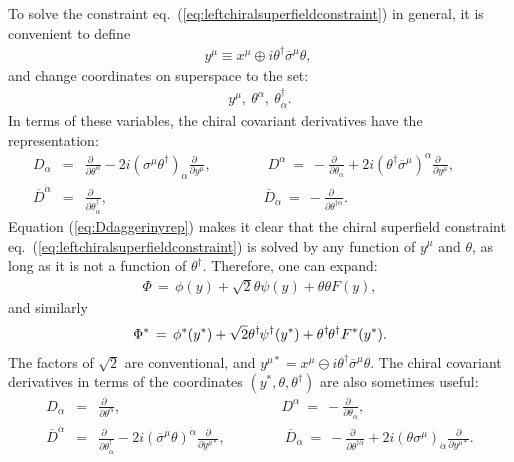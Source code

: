 \documentclass[11pt]{article}
\def\BDplus{+}
\def\BDminus{-}
\def\thetasigmamuthetadagger{\theta\sigma^\mu\theta^\dagger}
\def\BDplus{-}
\def\BDminus{+}
\def\thetasigmamuthetadagger{\theta^\dagger\sigmabar^\mu\theta}
\def\BDplus{\oplus}
\def\BDminus{\ominus}
\def\thetasigmamuthetadagger{\theta\sigma^\mu\theta^\dagger}
\def\BDplus{\ominus}
\def\BDminus{\oplus}
\def\thetasigmamuthetadagger{\theta^\dagger\sigmabar^\mu\theta}
\newcommand{\thdthd}{\theta^\dagger\hspace{-1pt}\theta^\dagger}
\def\beq{\begin{eqnarray}}
\def\eeq{\end{eqnarray}}
\def\sigmabar{\overline\sigma}
\def\Dcon{\overline D}
\begin{document}
To solve the constraint eq.~(\ref{eq:leftchiralsuperfieldconstraint}) in 
general, it is convenient to define
\beq
y^\mu \equiv x^\mu \BDminus i \thetasigmamuthetadagger ,\>
\label{eq:defineycoord}
\eeq
and change coordinates on superspace to the set:
\beq
y^\mu,\>\theta^\alpha,\>\theta^\dagger_{\dot\alpha}.
\eeq
In terms of these variables, the chiral covariant derivatives have the 
representation:
\beq
D_\alpha &=& \frac{\partial\phantom{x}}{\partial\theta^\alpha} 
-2i (\sigma^\mu \theta^\dagger)_\alpha 
\frac{\partial\phantom{x}}{\partial y^\mu} ,
\qquad\qquad
D^\alpha \>=\> -\frac{\partial\phantom{x}}{\partial\theta_\alpha} 
+2i (\theta^\dagger \sigmabar^\mu)^\alpha 
\frac{\partial\phantom{x}}{\partial y^\mu} ,
\phantom{xxxx}
\label{eq:Dinyrep}
\\
\Dcon^{\dot\alpha} &=& 
\frac{\partial\phantom{x}}{\partial\theta^\dagger_{\dot\alpha}} , 
\qquad\qquad\qquad\qquad\qquad\>\>\>\>\>
\Dcon_{\dot\alpha} \>=\> 
-\frac{\partial\phantom{x}}{\partial\theta^{\dagger\dot\alpha}} . 
\label{eq:Ddaggerinyrep}
\eeq
Equation (\ref{eq:Ddaggerinyrep}) makes it clear that the chiral 
superfield 
constraint eq.~(\ref{eq:leftchiralsuperfieldconstraint}) is solved by any 
function of $y^\mu$ and $\theta$, as long as it is not a function of $\theta^\dagger$. 
Therefore, one can expand:
\beq
\Phi \,=\,
\phi(y) + \sqrt{2}\theta \psi(y) + \theta\theta F(y) ,
\label{eq:Phiinyrep}
\eeq
and similarly
\beq
\Phi^* \,=\, 
\phi^*(y^*) + \sqrt{2}\theta^\dagger\hspace{-1pt} \psi^\dagger(y^*) 
+ \thdthd F^*(y^*) .
\label{eq:Phistarinyrep}
\eeq
The factors of $\sqrt{2}$ are conventional, and
$y^{\mu *} = x^\mu \BDplus i \thetasigmamuthetadagger $.
The chiral covariant derivatives in terms of the coordinates 
$(y^*,\theta,\theta^\dagger)$ are also sometimes useful:
\beq
D_\alpha &=& \frac{\partial\phantom{x}}{\partial\theta^\alpha} 
,
\qquad\qquad
\qquad\qquad\>
\qquad\quad\>
D^\alpha \>=\> -\frac{\partial\phantom{x}}{\partial\theta_\alpha} 
,
\\
\Dcon^{\dot\alpha} &=& 
\frac{\partial\phantom{x}}{\partial\theta^\dagger_{\dot\alpha}} 
-2i (\sigmabar^\mu \theta)^{\dot\alpha} 
\frac{\partial}{\partial y^{\mu *}}
,
\qquad\qquad\>
\Dcon_{\dot\alpha} \>=\> 
-\frac{\partial\phantom{x}}{\partial\theta^{\dagger\dot\alpha}} 
+2i (\theta \sigma^\mu)_{\dot\alpha}
\frac{\partial}{\partial y^{\mu *}}
.
\eeq
\end{document}
